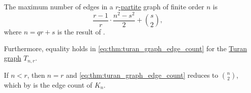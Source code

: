 \begin{proposition}\label{thm:turan_graph_edge_count}
  The maximum number of edges in a \hyperref[def:multipartite_graph]{\( r \)-partite} graph of finite order \( n \) is
  \begin{equation}\label{eq:thm:turan_graph_edge_count}
    \frac {r - 1} r \cdot \frac {n^2 - s^2} 2 + \binom s 2,
  \end{equation}
  where \( n = qr + s \) is the result of .

  Furthermore, equality holds in \eqref{eq:thm:turan_graph_edge_count} for the \hyperref[def:turan_graph]{Turan graph} \( T_{n,r} \).
\end{proposition}
\begin{comments}
  \item If \( n < r \), then \( n = r \) and \eqref{eq:thm:turan_graph_edge_count} reduces to \( \binom n 2 \), which by  is the edge count of \( K_n \).
\end{comments}
